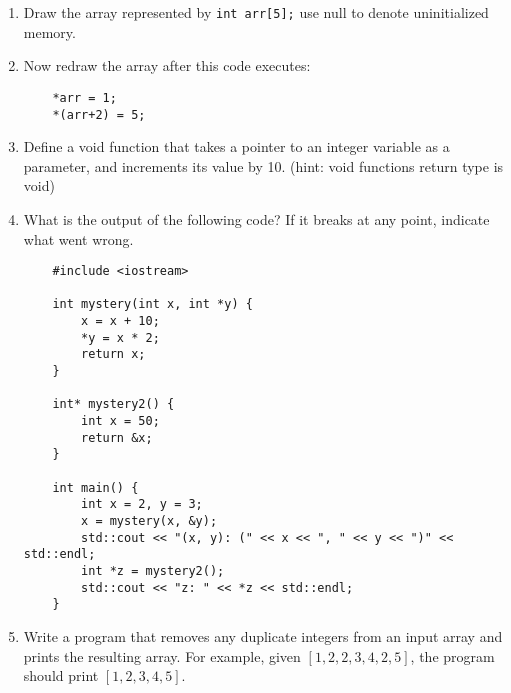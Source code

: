 \documentclass[11pt]{article}
\begin{document}
\begin{enumerate}[leftmargin=*]
\item Draw the array represented by \verb|int arr[5];| use null to denote uninitialized memory.

\item Now redraw the array after this code executes:
\begin{verbatim}
    *arr = 1;
    *(arr+2) = 5;
\end{verbatim}

\item Define a void function that takes a pointer to an integer variable as a parameter, and increments its value by 10. (hint: void functions return type is void)

\item What is the output of the following code? If it breaks at any point, indicate what went wrong.
\begin{verbatim}
    #include <iostream>

    int mystery(int x, int *y) {
        x = x + 10;
        *y = x * 2;
        return x;
    }

    int* mystery2() {
        int x = 50;
        return &x;
    }

    int main() {
        int x = 2, y = 3;
        x = mystery(x, &y);
        std::cout << "(x, y): (" << x << ", " << y << ")" << std::endl;
        int *z = mystery2();
        std::cout << "z: " << *z << std::endl;
    }
\end{verbatim}

\item Write a program that removes any duplicate integers from an input array and prints the resulting array. For example, given $[1, 2, 2, 3, 4, 2, 5]$, the program should print $[1, 2, 3, 4, 5]$.

\end{enumerate}

\label{r:lastpage}
\end{document}
